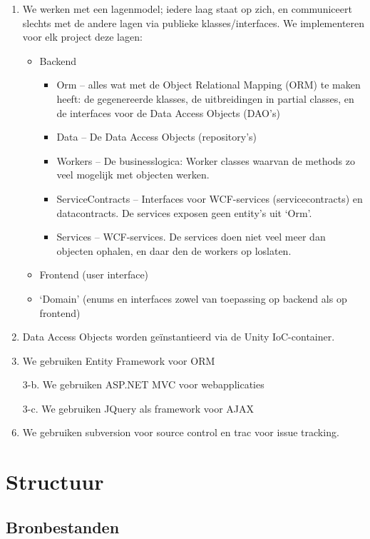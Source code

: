 \documentclass[a4paper,11pt]{article}
\begin{document}
\begin{enumerate}
\item We werken met een lagenmodel; iedere laag staat op zich, en communiceert slechts met de
andere lagen via publieke klasses/interfaces.  We implementeren voor elk
project deze lagen:
\begin{itemize}
\item Backend
\begin{itemize}
\item Orm -- alles wat met de Object Relational Mapping (ORM) te
maken heeft: de gegenereerde klasses, de uitbreidingen in partial classes,
en de interfaces voor de Data Access Objects (DAO's)
\item Data -- De Data Access Objects (repository's)
\item Workers -- De businesslogica: Worker classes waarvan de methods zo
veel mogelijk met objecten werken.
\item ServiceContracts -- Interfaces voor WCF-services (servicecontracts)
en datacontracts.  De services exposen geen entity's uit 
`Orm'.
\item Services -- WCF-services.  De services doen niet veel meer dan
objecten ophalen, en daar den de workers op loslaten.
\end{itemize}
\item Frontend (user interface)
\item `Domain' (enums en interfaces zowel van toepassing op backend als
op frontend)
\end{itemize}
\item Data Access Objects worden ge\"instantieerd via de Unity
IoC-container.
\item We gebruiken Entity Framework voor ORM
\item [3-b.] We gebruiken ASP.NET MVC voor webapplicaties
\item [3-c.] We gebruiken JQuery als framework voor AJAX
\item We gebruiken subversion voor source control en trac voor issue
tracking.
\end{enumerate}

\section{Structuur}

\subsection{Bronbestanden}
\end{document}
